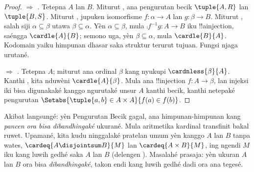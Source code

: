 \documentclass[../../../include/open-logic-section]{subfiles}
\begin{document}
\begin{proof}
\emph{ $\Rightarrow$ .} Tetepna $A$ lan
$B$. Miturut , ana pengurutan becik $\tuple{A, R}$
lan $\tuple{B, S}$. Miturut
, jupuken
isomorfisme $f \colon \alpha \to A$ lan $g \colon \beta \to B$.
Miturut , salah siji
$\alpha \subseteq \beta$ utawa $\beta \subseteq \alpha$.
Yèn $\alpha \subseteq \beta$, mula
$\comp{f^{-1}}{g} \colon A \to B$ iku !!a{injection}, saéngga
$\cardle{A}{B}$; semono uga, yèn $\beta \subseteq \alpha$, mula
$\cardle{B}{A}$.
Kodomain yaiku himpunan dhasar saka struktur terurut tujuan. Fungsi njaga urutané.

\emph{ $\Rightarrow$ .} Tetepna $A$;
miturut  ana ordinal $\beta$ kang nyukupi
$\cardnless{\beta}{A}$. Kanthi , kita nduwèni
$\cardle{A}{\beta}$. Mula ana !!{injection} $f \colon A \to
\beta$, lan injeksi iki bisa digunakaké kanggo ngurutaké unsur
$A$ kanthi becik, kanthi netepaké pengurutan
$\Setabs{\tuple{a, b} \in A \times A}{f(a) \in f(b)}$.
\end{proof}
\noindent
Akibat langsungé: yèn Pengurutan Becik gagal, ana himpunan-himpunan
kang \emph{pancen ora bisa dibandhingaké} ukurané. Mula aritmetika
kardinal transfinit bakal ruwet. Upamané, kita kudu ninggalaké
pratelan umum yèn kanggo $A$ lan $B$ tanpa wates,
$\cardeq{A \disjointsum B}{M}$ lan $\cardeq{A \times B}{M}$,
ing ngendi $M$ iku kang luwih gedhé saka $A$ lan $B$ (delengen
). Masalahé prasaja:
yèn ukuran $A$ lan $B$ ora bisa \emph{dibandhingaké}, takon endi
kang luwih gedhé dadi ora ana tegesé.
\end{document}
